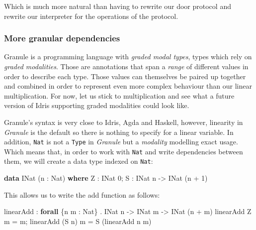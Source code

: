 \documentclass[
]{article}
\newenvironment{Shaded}{}{}
\newcommand{\DataTypeTok}[1]{\textcolor[rgb]{0.56,0.13,0.00}{#1}}
\newcommand{\DecValTok}[1]{\textcolor[rgb]{0.25,0.63,0.44}{#1}}
\newcommand{\KeywordTok}[1]{\textcolor[rgb]{0.00,0.44,0.13}{\textbf{#1}}}
\newcommand{\NormalTok}[1]{#1}
\newcommand{\OperatorTok}[1]{\textcolor[rgb]{0.40,0.40,0.40}{#1}}
\newcommand{\OtherTok}[1]{\textcolor[rgb]{0.00,0.44,0.13}{#1}}
\begin{document}
Which is much more natural than having to rewrite our door protocol and
rewrite our interpreter for the operations of the protocol.

\hypertarget{more-granular-dependencies}{%
\subsubsection{More granular
dependencies}\label{more-granular-dependencies}}

Granule is a programming language with \emph{graded modal types}, types
which rely on \emph{graded modalities}. Those are annotations that span
a \emph{range} of different values in order to describe each type. Those
values can themselves be paired up together and combined in order to
represent even more complex behaviour than our linear multiplication.
For now, let us stick to multiplication and see what a future version of
Idris supporting graded modalities could look like.

Granule's syntax is very close to Idris, Agda and Haskell, however,
linearity in \emph{Granule} is the default so there is nothing to
specify for a linear variable. In addition, \texttt{Nat} is not a
\texttt{Type} in \emph{Granule} but a \emph{modality} modelling exact
usage. Which means that, in order to work with \texttt{Nat} and write
dependencies between them, we will create a data type indexed on
\texttt{Nat}:

\begin{Shaded}
\begin{Highlighting}[]
\KeywordTok{data} \DataTypeTok{INat}\NormalTok{ (n }\OperatorTok{:} \DataTypeTok{Nat}\NormalTok{) }\KeywordTok{where}
  \DataTypeTok{Z} \OperatorTok{:} \DataTypeTok{INat} \DecValTok{0}\NormalTok{;}
  \DataTypeTok{S} \OperatorTok{:} \DataTypeTok{INat}\NormalTok{ n }\OtherTok{{-}\textgreater{}} \DataTypeTok{INat}\NormalTok{ (n }\OperatorTok{+} \DecValTok{1}\NormalTok{)}
\end{Highlighting}
\end{Shaded}

This allows us to write the add function as follows:

\begin{Shaded}
\begin{Highlighting}[]
\NormalTok{linearAdd }\OperatorTok{:} \KeywordTok{forall}\NormalTok{ \{n m }\OperatorTok{:} \DataTypeTok{Nat}\NormalTok{\} }\OperatorTok{.} \DataTypeTok{INat}\NormalTok{ n }\OtherTok{{-}\textgreater{}} \DataTypeTok{INat}\NormalTok{ m }\OtherTok{{-}\textgreater{}} \DataTypeTok{INat}\NormalTok{ (n }\OperatorTok{+}\NormalTok{ m)}
\NormalTok{linearAdd }\DataTypeTok{Z}\NormalTok{ m }\OtherTok{=}\NormalTok{ m;}
\NormalTok{linearAdd (}\DataTypeTok{S}\NormalTok{ n) m }\OtherTok{=} \DataTypeTok{S}\NormalTok{ (linearAdd n m)}
\end{Highlighting}
\end{Shaded}
\end{document}
